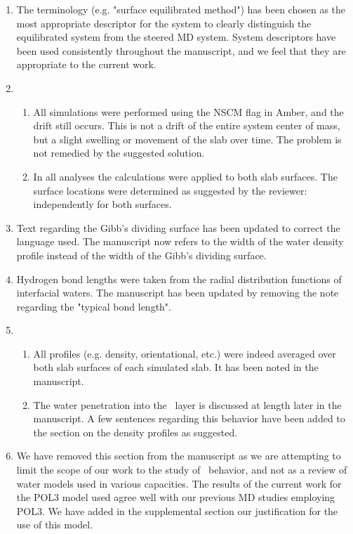 \documentclass{article}
\begin{document}
\begin{enumerate}
\item The terminology (e.g. "surface equilibrated method") has been chosen as the most appropriate descriptor for the system to clearly distinguish the equilibrated system from the steered MD system. System descriptors have been used consistently throughout the manuscript, and we feel that they are appropriate to the current work.

\item 
\begin{enumerate}
\item All simulations were performed using the NSCM flag in Amber, and the drift still occurs. This is not a drift of the entire system center of mass, but a slight swelling or movement of the slab over time. The problem is not remedied by the suggested solution.

\item In all analyses the calculations were applied to both slab surfaces. The surface locations were determined as suggested by the reviewer: independently for both surfaces.
\end{enumerate}

\item Text regarding the Gibb's dividing surface has been updated to correct the language used. The manuscript now refers to the width of the water density profile instead of the width of the Gibb's dividing surface.

\item Hydrogen bond lengths were taken from the radial distribution functions of interfacial waters. The manuscript has been updated by removing the note regarding the "typical bond length".

\item 
\begin{enumerate}
\item All profiles (e.g. density, orientational, etc.) were indeed averaged over both slab surfaces of each simulated slab. It has been noted in the manuscript.

\item The water penetration into the \suldiox~layer is discussed at length later in the manuscript. A few sentences regarding this behavior have been added to the section on the density profiles as suggested.
\end{enumerate}

\item We have removed this section from the manuscript as we are attempting to limit the scope of our work to the study of \suldiox~behavior, and not as a review of water models used in various capacities. The results of the current work for the POL3 model used agree well with our previous MD studies employing POL3. We have added in the supplemental section our justification for the use of this model.

\end{enumerate}
\end{document}
